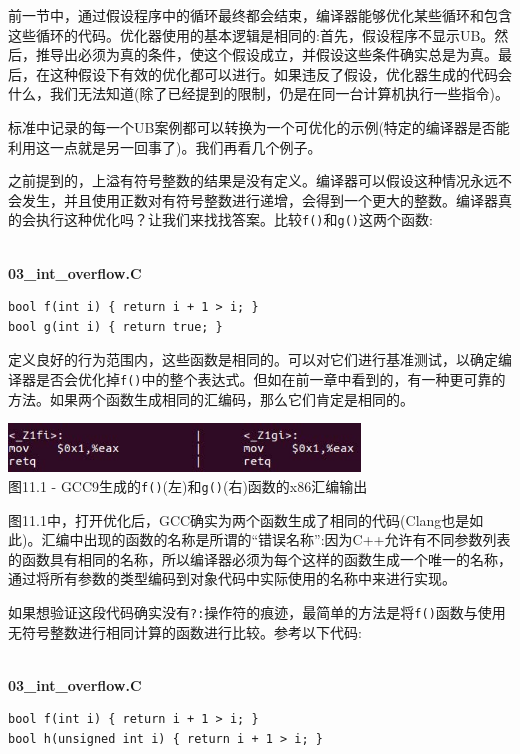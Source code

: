 前一节中，通过假设程序中的循环最终都会结束，编译器能够优化某些循环和包含这些循环的代码。优化器使用的基本逻辑是相同的:首先，假设程序不显示UB。然后，推导出必须为真的条件，使这个假设成立，并假设这些条件确实总是为真。最后，在这种假设下有效的优化都可以进行。如果违反了假设，优化器生成的代码会什么，我们无法知道(除了已经提到的限制，仍是在同一台计算机执行一些指令)。

标准中记录的每一个UB案例都可以转换为一个可优化的示例(特定的编译器是否能利用这一点就是另一回事了)。我们再看几个例子。

之前提到的，上溢有符号整数的结果是没有定义。编译器可以假设这种情况永远不会发生，并且使用正数对有符号整数进行递增，会得到一个更大的整数。编译器真的会执行这种优化吗？让我们来找找答案。比较\texttt{f()}和\texttt{g()}这两个函数:

\hspace*{\fill} \\ %
\noindent
\textbf{03\_int\_overflow.C}
\begin{lstlisting}[style=styleCXX]
bool f(int i) { return i + 1 > i; }
bool g(int i) { return true; }
\end{lstlisting}

定义良好的行为范围内，这些函数是相同的。可以对它们进行基准测试，以确定编译器是否会优化掉\texttt{f()}中的整个表达式。但如在前一章中看到的，有一种更可靠的方法。如果两个函数生成相同的汇编码，那么它们肯定是相同的。 

\begin{center}
\includegraphics[width=0.7\textwidth]{content/3/chapter11/images/1.jpg}\\
图11.1 - GCC9生成的\texttt{f()}(左)和\texttt{g()}(右)函数的x86汇编输出
\end{center}

图11.1中，打开优化后，GCC确实为两个函数生成了相同的代码(Clang也是如此)。汇编中出现的函数的名称是所谓的“错误名称”:因为C++允许有不同参数列表的函数具有相同的名称，所以编译器必须为每个这样的函数生成一个唯一的名称，通过将所有参数的类型编码到对象代码中实际使用的名称中来进行实现。

如果想验证这段代码确实没有\texttt{?:}操作符的痕迹，最简单的方法是将\texttt{f()}函数与使用无符号整数进行相同计算的函数进行比较。参考以下代码:

\hspace*{\fill} \\ %
\noindent
\textbf{03\_int\_overflow.C}
\begin{lstlisting}[style=styleCXX]
bool f(int i) { return i + 1 > i; }
bool h(unsigned int i) { return i + 1 > i; }
\end{lstlisting}

